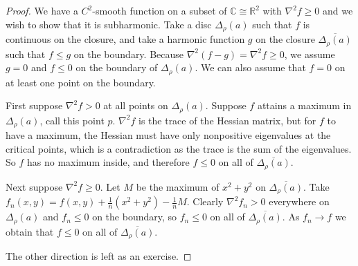 \documentclass[12pt,openany]{book}
\newcommand{\C}{{\mathbb{C}}}
\newcommand{\R}{{\mathbb{R}}}
\theoremstyle{plain}
\theoremstyle{remark}
\theoremstyle{definition}
\theoremstyle{exercise}
\theoremstyle{example}
\begin{document}
\begin{proof}
We have a $C^2$-smooth function on a subset of $\C \cong \R^2$
with $\nabla^2 f \geq 0$ and we wish to show that it is subharmonic.
Take a disc $\Delta_\rho(a)$ such that
$f$ is continuous on the closure, and take a harmonic function $g$ on the
closure $\overline{\Delta_\rho(a)}$
such that $f \leq g$ on the boundary.  Because
$\nabla^2 (f-g) = \nabla^2 f \geq 0$, we assume $g = 0$ and $f \leq 0$
on the boundary of $\Delta_\rho(a)$.  We can also assume that $f = 0$ on at least one point on
the boundary.

First suppose $\nabla^2 f > 0$ at all points on $\Delta_\rho(a)$.
Suppose $f$ attains a maximum in $\Delta_\rho(a)$,
call this point $p$.  
$\nabla^2 f$ is the trace of the Hessian matrix, but for $f$ to have a
maximum, the Hessian must have only nonpositive eigenvalues at the critical
points, which is a
contradiction as the trace is the sum of the eigenvalues.  So $f$ has no
maximum inside, and therefore $f \leq 0$ on all of
$\overline{\Delta_\rho(a)}$.

Next suppose $\nabla^2 f \geq 0$.
Let $M$ be the maximum of $x^2+y^2$ on $\overline{\Delta_\rho(a)}$.
Take $f_n(x,y) = f(x,y) + \frac{1}{n}
( x^2+y^2 ) - \frac{1}{n}M$.  Clearly $\nabla^2 f_n > 0$ everywhere on
$\Delta_\rho(a)$ and
$f_n \leq 0$ on the boundary, so $f_n \leq 0$ 
on all of $\overline{\Delta_\rho(a)}$.  As $f_n \to f$ we obtain that
$f \leq 0$ on all of $\overline{\Delta_\rho(a)}$.

The other direction is left as an exercise.
%
%
\end{proof}
\end{document}

